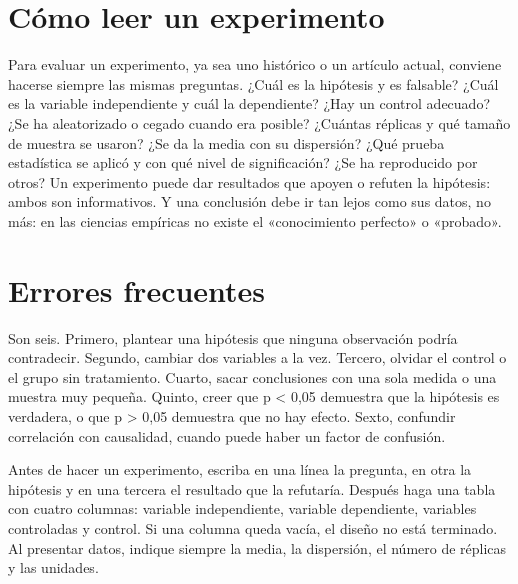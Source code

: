 \documentclass{book}
\begin{document}
\section{Cómo leer un experimento}

Para evaluar un experimento, ya sea uno histórico o un artículo actual, conviene hacerse siempre las mismas preguntas. ¿Cuál es la hipótesis y es falsable? ¿Cuál es la variable independiente y cuál la dependiente? ¿Hay un control adecuado? ¿Se ha aleatorizado o cegado cuando era posible? ¿Cuántas réplicas y qué tamaño de muestra se usaron? ¿Se da la media con su dispersión? ¿Qué prueba estadística se aplicó y con qué nivel de significación? ¿Se ha reproducido por otros? Un experimento puede dar resultados que apoyen o refuten la hipótesis: ambos son informativos. Y una conclusión debe ir tan lejos como sus datos, no más: en las ciencias empíricas no existe el «conocimiento perfecto» o «probado».


\section{Errores frecuentes}

Son seis. Primero, plantear una hipótesis que ninguna observación podría contradecir. Segundo, cambiar dos variables a la vez. Tercero, olvidar el control o el grupo sin tratamiento. Cuarto, sacar conclusiones con una sola medida o una muestra muy pequeña. Quinto, creer que p < 0,05 demuestra que la hipótesis es verdadera, o que p > 0,05 demuestra que no hay efecto. Sexto, confundir correlación con causalidad, cuando puede haber un factor de confusión.


\begin{tcolorbox}[title={Consejo}, studiumtip, breakable]

Antes de hacer un experimento, escriba en una línea la pregunta, en otra la hipótesis y en una tercera el resultado que la refutaría. Después haga una tabla con cuatro columnas: variable independiente, variable dependiente, variables controladas y control. Si una columna queda vacía, el diseño no está terminado. Al presentar datos, indique siempre la media, la dispersión, el número de réplicas y las unidades.

\end{tcolorbox}
\end{document}
